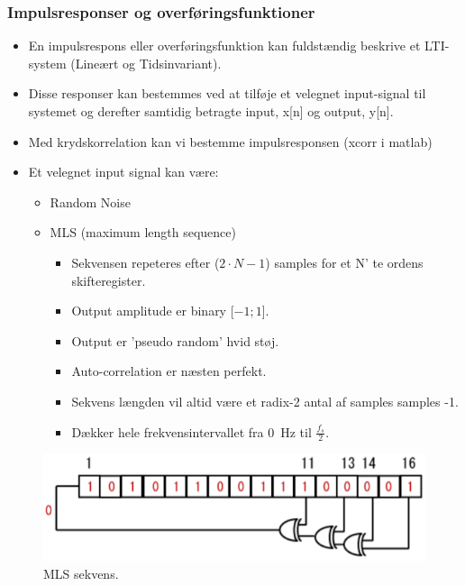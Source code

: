 \subsubsection{Impulsresponser og overføringsfunktioner}
\begin{itemize}
	\item En impulsrespons eller overføringsfunktion kan fuldstændig beskrive et LTI-system (Lineært og	Tidsinvariant).
	\item Disse responser kan bestemmes ved at tilføje et velegnet input-signal til systemet og derefter samtidig betragte input, x[n] og output, y[n].
	\item Med krydskorrelation kan vi bestemme impulsresponsen (xcorr i matlab)
	\item Et velegnet input signal kan være:
	\begin{itemize}
		\item Random Noise
		\item MLS (maximum length sequence)
		\begin{itemize}
			\item Sekvensen repeteres efter ($2\cdot N-1$) samples for et N'
			te ordens skifteregister.
			\item Output amplitude er binary [$-1; 1$].
			\item Output er 'pseudo random' hvid støj.
			\item Auto-correlation er næsten perfekt.
			\item Sekvens længden vil altid være et radix-2 antal af samples samples -1.
			\item Dækker hele frekvensintervallet fra \SI{0}{\hertz} til $\frac{f_s}{2}$.
		\end{itemize}
	\end{itemize}
\end{itemize}

\begin{figure} [H]
	\centering
	\includegraphics[width=0.6\linewidth]{graphics/45.png}
	\caption{MLS sekvens.}
	\label{fig:45}
\end{figure}

